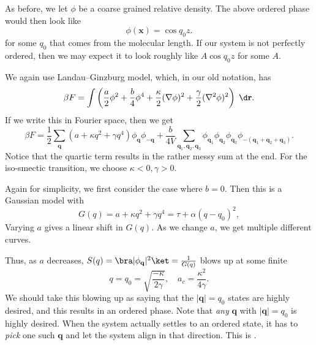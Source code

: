 \documentclass[a4paper]{article}
\begin{document}
As before, we let $\phi$ be a coarse grained relative density. The above ordered phase would then look like
\[
  \phi(\mathbf{x}) = \cos q_0 z.
\]
for some $q_0$ that comes from the molecular length. If our system is not perfectly ordered, then we may expect it to look roughly like $A \cos q_0 z$ for some $A$.

We again use Landau--Ginzburg model, which, in our old notation, has
\[
  \beta F = \int \left(\frac{a}{2} \phi^2 + \frac{b}{4} \phi^4 + \frac{\kappa}{2} (\nabla \phi)^2 + \frac{\gamma}{2} (\nabla^2 \phi)^2\right)\;\d \mathbf{r}.
\]
If we write this in Fourier space, then we get
\[
  \beta F = \frac{1}{2} \sum_{\mathbf{q}} (a + \kappa q^2 + \gamma q^4) \phi_{\mathbf{q}} \phi_{-\mathbf{q}} + \frac{b}{4V} \sum_{\mathbf{q}_1, \mathbf{q}_2, \mathbf{q}_3} \phi_{\mathbf{q}_1} \phi_{\mathbf{q}_2} \phi_{\mathbf{q}_3} \phi_{-(\mathbf{q}_1 + \mathbf{q}_2 + \mathbf{q}_3)}.
\]
Notice that the quartic term results in the rather messy sum at the end. For the iso-smectic transition, we choose $\kappa < 0, \gamma > 0$.

Again for simplicity, we first consider the case where $b = 0$. Then this is a Gaussian model with
\[
  G(q) = a + \kappa q^2 + \gamma q^4 = \tau + \alpha(q - q_0)^2,
\]
Varying $a$ gives a linear shift in $G(q)$. As we change $a$, we get multiple different curves.
\begin{center}
\end{center}
Thus, as $a$ decreases, $S(q) = \bra |\phi_\mathbf{q}|^2 \ket = \frac{1}{G(q)}$ blows up at some finite
\[
  q = q_0 = \sqrt{\frac{-\kappa}{2\gamma}},\quad a_c = \frac{\kappa^2}{4 \gamma}.
\]
We should take this blowing up as saying that the $|\mathbf{q}| = q_0$ states are highly desired, and this results in an ordered phase. Note that \emph{any} $\mathbf{q}$ with $|\mathbf{q}| = q_0$ is highly desired. When the system actually settles to an ordered state, it has to \emph{pick} one such $\mathbf{q}$ and let the system align in that direction. This is .
\end{document}
